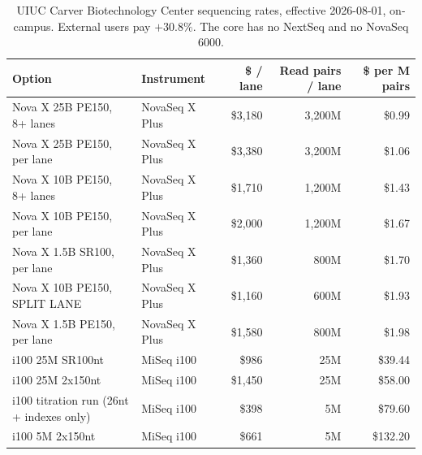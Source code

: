 \begin{table}[htbp]\centering
\footnotesize
\caption[]{UIUC Carver Biotechnology Center sequencing rates, effective 2026-08-01, on-campus. External users pay $+30.8\%$. The core has no NextSeq and no NovaSeq 6000.}\label{tab:sequencing}
\begin{tabular}{llrrr}
\toprule
Option & Instrument & \$ / lane & Read pairs / lane & \$ per M pairs \\
\midrule
Nova X 25B PE150, 8+ lanes & NovaSeq X Plus & \$3{,}180 & 3{,}200M & \$0.99 \\
Nova X 25B PE150, per lane & NovaSeq X Plus & \$3{,}380 & 3{,}200M & \$1.06 \\
Nova X 10B PE150, 8+ lanes & NovaSeq X Plus & \$1{,}710 & 1{,}200M & \$1.43 \\
Nova X 10B PE150, per lane & NovaSeq X Plus & \$2{,}000 & 1{,}200M & \$1.67 \\
Nova X 1.5B SR100, per lane & NovaSeq X Plus & \$1{,}360 & 800M & \$1.70 \\
Nova X 10B PE150, SPLIT LANE & NovaSeq X Plus & \$1{,}160 & 600M & \$1.93 \\
Nova X 1.5B PE150, per lane & NovaSeq X Plus & \$1{,}580 & 800M & \$1.98 \\
i100 25M SR100nt & MiSeq i100 & \$986 & 25M & \$39.44 \\
i100 25M 2x150nt & MiSeq i100 & \$1{,}450 & 25M & \$58.00 \\
i100 titration run (26nt + indexes only) & MiSeq i100 & \$398 & 5M & \$79.60 \\
i100 5M 2x150nt & MiSeq i100 & \$661 & 5M & \$132.20 \\
\bottomrule
\end{tabular}
\end{table}
